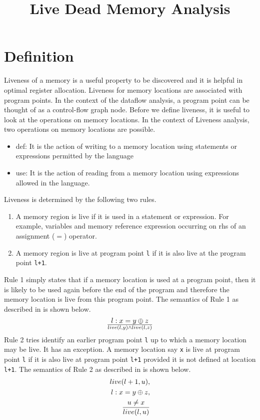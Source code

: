 \documentclass{article}
\title{Live Dead Memory Analysis}
\date{}
\begin{document}
\maketitle

\section{Definition}
Liveness of a memory is a useful property to be discovered and it is helpful in optimal register allocation. Liveness for memory locations are associated with program points. In the context of the dataflow analysis, a program point can be thought of as a control-flow graph node. Before we define liveness, it is useful to look at the operations on memory locations. 
In the context of Liveness analysis, two operations on memory locations are possible.
\begin{itemize}
\item def:  It is the action of writing to a memory location using statements or expressions permitted by the language
\item use: It is the action of reading from a memory location using expressions allowed in the language.
\end{itemize}
Liveness is determined by the following two rules.
\begin{enumerate}
\item A memory region is live if it is used in a statement or expression. For example, variables and memory reference expression occurring on rhs of an assignment ($=$) operator. 
\item A memory region is live at program point \texttt{l} if it is also live at the program point \texttt{l+1}.
\end{enumerate}
Rule 1 simply states that if a memory location is used at a program point, then it is likely to be used again before the end of the program and therefore the memory location is live from this program point. The semantics of Rule 1 as described in \cite{pfenning-lec-liveness} is shown below.
\begin{equation*}
l: x = y \oplus z \over live(l, y) \land live(l, z)
\end{equation*}
Rule 2 tries identify an earlier program point \texttt{l} up to which a memory location may be live. It has an exception. A memory location say \texttt{x} is live at program point \texttt{l} if it is also live at program point \texttt{l+1} provided it is not defined at location \texttt{l+1}. The semantics of Rule 2 as described in \cite{pfenning-lec-liveness} is shown below.
\begin{eqnarray*}
live(l+1, u), \\ l: x = y \oplus z,  \\ u \neq x \over live(l, u)
\end{eqnarray*}
\end{document}
